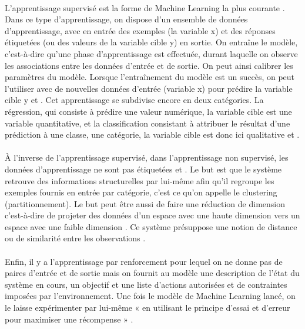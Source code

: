 \documentclass{article}
\begin{document}
\paragraph{}
L’apprentissage supervisé est la forme de Machine Learning la plus courante \cite[p. 123]{lemberger2019big}. Dans ce type d’apprentissage, on dispose d’un ensemble de données d’apprentissage, avec en entrée des exemples (la variable x) et des réponses étiquetées (ou des valeurs de la variable cible y) en sortie. On entraîne le modèle, c’est-à-dire qu’une phase d’apprentissage est effectuée, durant laquelle on observe les associations entre les données d’entrée et de sortie. On peut ainsi calibrer les paramètres du modèle. Lorsque l’entraînement du modèle est un succès, on peut l’utiliser avec de nouvelles données d’entrée (variable x) pour prédire la variable cible y \cite[p. 687]{janiesch2021machine} et \cite[p. 123]{lemberger2019big}. Cet apprentissage se subdivise encore en deux  catégories. La régression, qui consiste à prédire une valeur numérique, la variable cible est une variable quantitative\cite[p. 123]{lemberger2019big}, et la classification consistant à attribuer le résultat d’une prédiction à une classe, une catégorie, la variable cible est donc ici qualitative \cite[p. 687]{janiesch2021machine} et \cite[p. 123]{lemberger2019big}.
\paragraph{}
À l’inverse de l’apprentissage supervisé, dans l’apprentissage non supervisé, les données d’apprentissage ne sont pas étiquetées \cite[p. 687]{janiesch2021machine} et \cite[p. 123]{lemberger2019big}. Le but est que le système retrouve des informations structurelles par lui-même afin qu’il regroupe les exemples fournis en entrée par catégorie, c’est ce qu’on appelle le clustering (partitionnement). Le but peut être aussi de faire une réduction de dimension c’est-à-dire de projeter des données d’un espace avec une haute dimension vers un espace avec une faible dimension \cite[p. 687]{janiesch2021machine}. Ce système présuppose une notion de distance ou de similarité entre les observations \cite[p. 123]{lemberger2019big}. 
\paragraph{}
Enfin, il y a l’apprentissage par renforcement pour lequel on ne donne pas de paires d’entrée et de sortie mais on fournit au modèle une description de l’état du système en cours, un objectif et une liste d’actions autorisées et de contraintes imposées par l’environnement. Une fois le modèle de Machine Learning lancé, on le laisse expérimenter par lui-même « en utilisant le principe d’essai et d’erreur pour maximiser une récompense » \cite[p. 687]{janiesch2021machine}. 
\end{document}
